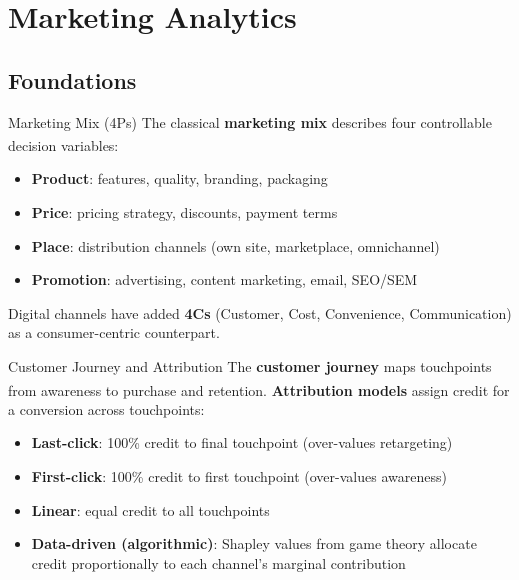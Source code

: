 \section{Marketing Analytics}

\subsection{Foundations}


\begin{v3topic}{Marketing Mix (4Ps)}
    The classical \textbf{marketing mix} describes four controllable decision variables\textsuperscript{\cite[][pp.~18--24]{chaffeyDigitalBusinessECommerce2019}}:
    \begin{itemize}
        \item \textbf{Product}: features, quality, branding, packaging
        \item \textbf{Price}: pricing strategy, discounts, payment terms
        \item \textbf{Place}: distribution channels (own site, marketplace, omnichannel)
        \item \textbf{Promotion}: advertising, content marketing, email, SEO/SEM
    \end{itemize}
    Digital channels have added \textbf{4Cs} (Customer, Cost, Convenience, Communication) as a consumer-centric counterpart.

\end{v3topic}
\begin{v3topic}{Customer Journey and Attribution}
    The \textbf{customer journey} maps touchpoints from awareness to purchase and retention\textsuperscript{\cite[][pp.~92--98]{chaffeyDigitalBusinessECommerce2019}}.
    \textbf{Attribution models} assign credit for a conversion across touchpoints:
    \begin{itemize}
        \item \textbf{Last-click}: 100\% credit to final touchpoint (over-values retargeting)
        \item \textbf{First-click}: 100\% credit to first touchpoint (over-values awareness)
        \item \textbf{Linear}: equal credit to all touchpoints
        \item \textbf{Data-driven (algorithmic)}: Shapley values from game theory allocate credit proportionally to each channel's marginal contribution
    \end{itemize}

\end{v3topic}

